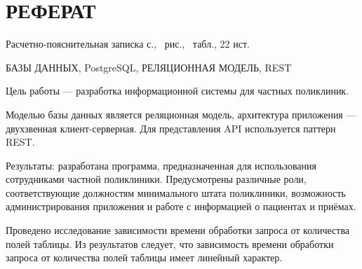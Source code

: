 \section*{\large РЕФЕРАТ}

Расчетно-пояснительная записка \pageref{LastPage} с., \totalfigures\ рис., \totaltables\ табл., 22 ист.

БАЗЫ ДАННЫХ, PostgreSQL, РЕЛЯЦИОННАЯ МОДЕЛЬ, REST


Цель работы --- разработка информационной системы для частных поликлиник.

Моделью базы данных является реляционная модель, архитектура приложения --- двухзвенная клиент-серверная.
Для представления API используется паттерн REST.

Результаты: разработана программа, предназначенная для использования сотрудниками частной поликлиники. Предусмотрены различные роли, соответствующие должностям минимального штата поликлиники, возможность администрирования приложения и работе с информацией о пациентах и приёмах.

Проведено исследование зависимости времени обработки запроса от количества полей таблицы.
Из результатов следует, что зависимость времени обработки запроса от количества полей таблицы имеет линейный характер.

\pagebreak